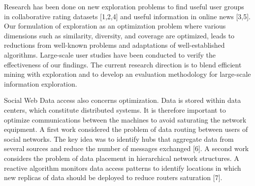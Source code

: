 Research has been done on new exploration problems to find useful user groups in collaborative rating datasets [1,2,4] and useful information in online news [3,5]. Our formulation of exploration as an optimization problem where various dimensions such as similarity, diversity, and coverage are optimized, leads to reductions from well-known problems and adaptations of well-established algorithms. Large-scale user studies have been conducted to verify the effectiveness of our findings. The current research direction is to blend efficient mining with exploration and to develop an evaluation methodology for large-scale information exploration.

Social Web Data access also concerns optimization. Data is stored within data centers, which constitute distributed systems. It is therefore important to optimize communications between the machines to avoid saturating the network equipment. A first work considered the problem of data routing between users of social networks. The key idea was to identify hubs that aggregate data from several sources and reduce the number of messages exchanged [6]. A second work considers the problem of data placement in hierarchical network structures. A reactive algorithm monitors data access patterns to identify locations in which new replicas of data should be deployed to reduce routers saturation [7].

